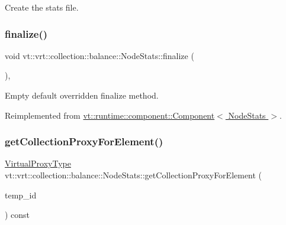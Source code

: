 Create the stats file. 

\mbox{\label{structvt_1_1vrt_1_1collection_1_1balance_1_1_node_stats_a267ac0f73734b89797be774b0bd6e7d1}} 
\subsubsection{\texorpdfstring{finalize()}{finalize()}}
{\footnotesize\ttfamily void vt\+::vrt\+::collection\+::balance\+::\+Node\+Stats\+::finalize (\begin{DoxyParamCaption}{ }\end{DoxyParamCaption})\hspace{0.3cm}{\ttfamily [override]}, {\ttfamily [virtual]}}



Empty default overridden finalize method. 



Reimplemented from \hyperlink{structvt_1_1runtime_1_1component_1_1_component_a098e362de01af6054e5491fba671a959}{vt\+::runtime\+::component\+::\+Component$<$ Node\+Stats $>$}.

\mbox{\label{structvt_1_1vrt_1_1collection_1_1balance_1_1_node_stats_aee43291b1cc63a189b3851f92e83040b}} 
\subsubsection{\texorpdfstring{get\+Collection\+Proxy\+For\+Element()}{getCollectionProxyForElement()}}
{\footnotesize\ttfamily \hyperlink{namespacevt_a1b417dd5d684f045bb58a0ede70045ac}{Virtual\+Proxy\+Type} vt\+::vrt\+::collection\+::balance\+::\+Node\+Stats\+::get\+Collection\+Proxy\+For\+Element (\begin{DoxyParamCaption}\item[{\hyperlink{namespacevt_1_1vrt_1_1collection_1_1balance_a14c8d2c972f2913aa3f1636e5be0a120}{Element\+I\+D\+Type}}]{temp\+\_\+id }\end{DoxyParamCaption}) const}




